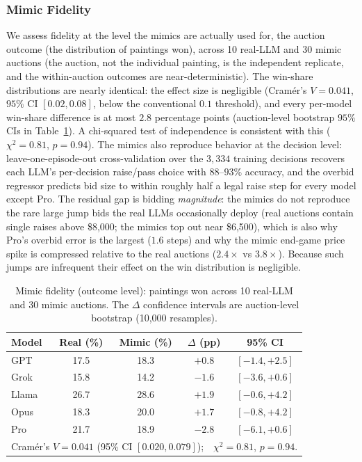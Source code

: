 \documentclass[conference]{IEEEtran}
\begin{document}
\subsubsection{Mimic Fidelity}
\label{sec:fidelity-results}
We assess fidelity at the level the mimics are actually used for, the auction outcome (the distribution of paintings won), across 10 real-LLM and 30 mimic auctions (the auction, not the individual painting, is the independent replicate, and the within-auction outcomes are near-deterministic). The win-share distributions are nearly identical: the effect size is negligible (Cram\'er's $V = 0.041$, $95\%$ CI $[0.02, 0.08]$, below the conventional $0.1$ threshold), and every per-model win-share difference is at most $2.8$ percentage points (auction-level bootstrap $95\%$ CIs in Table~\ref{tab:mimic_fidelity}). A chi-squared test of independence is consistent with this ($\chi^2 = 0.81$, $p = 0.94$). The mimics also reproduce behavior at the decision level: leave-one-episode-out cross-validation over the $3{,}334$ training decisions recovers each LLM's per-decision raise/pass choice with $88$--$93\%$ accuracy, and the overbid regressor predicts bid size to within roughly half a legal raise step for every model except Pro. The residual gap is bidding \emph{magnitude}: the mimics do not reproduce the rare large jump bids the real LLMs occasionally deploy (real auctions contain single raises above \$8{,}000; the mimics top out near \$6{,}500), which is also why Pro's overbid error is the largest ($1.6$ steps) and why the mimic end-game price spike is compressed relative to the real auctions ($2.4\times$ vs $3.8\times$). Because such jumps are infrequent their effect on the win distribution is negligible.

\begin{table}[htbp]
\caption{Mimic fidelity (outcome level): paintings won across 10 real-LLM and 30 mimic auctions. The $\Delta$ confidence intervals are auction-level bootstrap (10{,}000 resamples).}
\label{tab:mimic_fidelity}
\centering
\begin{tabular}{lcccc}
\hline
Model & Real (\%) & Mimic (\%) & $\Delta$ (pp) & 95\% CI \\
\hline
GPT & 17.5 & 18.3 & $+0.8$ & $[-1.4, +2.5]$ \\
Grok    & 15.8 & 14.2 & $-1.6$ & $[-3.6, +0.6]$ \\
Llama   & 26.7 & 28.6 & $+1.9$ & $[-0.6, +4.2]$ \\
Opus    & 18.3 & 20.0 & $+1.7$ & $[-0.8, +4.2]$ \\
Pro     & 21.7 & 18.9 & $-2.8$ & $[-6.1, +0.6]$ \\
\hline
\multicolumn{5}{l}{Cram\'er's $V = 0.041$ (95\% CI $[0.020, 0.079]$);\ \ $\chi^2 = 0.81$, $p = 0.94$.} \\
\hline
\end{tabular}
\end{table}
\end{document}
